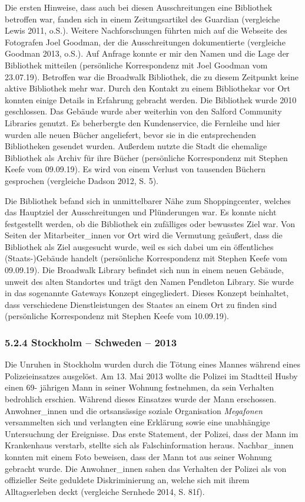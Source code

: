 \documentclass[a4paper,
fontsize=11pt,
oneside,
numbers=noperiodatend,
parskip=half-,
bibliography=totoc,
final
]{scrartcl}
\begin{document}
Die ersten Hinweise, dass auch bei diesen Ausschreitungen eine
Bibliothek betroffen war, fanden sich in einem Zeitungsartikel des
Guardian (vergleiche Lewis 2011, o.S.). Weitere Nachforschungen führten
mich auf die Webseite des Fotografen Joel Goodman, der die
Ausschreitungen dokumentierte (vergleiche Goodman 2013, o.S.). Auf
Anfrage konnte er mir den Namen und die Lage der Bibliothek mitteilen
(persönliche Korrespondenz mit Joel Goodman vom 23.07.19). Betroffen war
die Broadwalk Bibliothek, die zu diesem Zeitpunkt keine aktive
Bibliothek mehr war. Durch den Kontakt zu einem Bibliothekar vor Ort
konnten einige Details in Erfahrung gebracht werden. Die Bibliothek
wurde 2010 geschlossen. Das Gebäude wurde aber weiterhin von den Salford
Community Libraries genutzt. Es beherbergte den Kundenservice, die
Fernleihe und hier wurden alle neuen Bücher angeliefert, bevor sie in
die entsprechenden Bibliotheken gesendet wurden. Außerdem nutzte die
Stadt die ehemalige Bibliothek als Archiv für ihre Bücher (persönliche
Korrespondenz mit Stephen Keefe vom 09.09.19). Es wird von einem Verlust
von tausenden Büchern gesprochen (vergleiche Dadson 2012, S. 5).

Die Bibliothek befand sich in unmittelbarer Nähe zum Shoppingcenter,
welches das Hauptziel der Ausschreitungen und Plünderungen war. Es
konnte nicht festgestellt werden, ob die Bibliothek ein zufälliges oder
bewusstes Ziel war. Von Seiten der Mitarbeiter\_innen vor Ort wird die
Vermutung geäußert, dass die Bibliothek als Ziel ausgesucht wurde, weil
es sich dabei um ein öffentliches (Staats-)Gebäude handelt (persönliche
Korrespondenz mit Stephen Keefe vom 09.09.19). Die Broadwalk Library
befindet sich nun in einem neuen Gebäude, unweit des alten Standortes
und trägt den Namen Pendleton Library. Sie wurde in das sogenannte
Gateways Konzept eingegliedert. Dieses Konzept beinhaltet, dass
verschiedene Dienstleistungen des Staates an einem Ort zu finden sind
(persönliche Korrespondenz mit Stephen Keefe vom 10.09.19).

\hypertarget{stockholm-schweden-2013}{%
\subsubsection{5.2.4 Stockholm -- Schweden --
2013}\label{stockholm-schweden-2013}}

Die Unruhen in Stockholm wurden durch die Tötung eines Mannes während
eines Polizeieinsatzes ausgelöst. Am 13. Mai 2013 wollte die Polizei im
Stadtteil Husby einen 69- jährigen Mann in seiner Wohnung festnehmen, da
sein Verhalten bedrohlich erschien. Während dieses Einsatzes wurde der
Mann erschossen. Anwohner\_innen und die ortsansässige soziale
Organisation \emph{Megafonen} versammelten sich und verlangten eine
Erklärung sowie eine unabhängige Untersuchung der Ereignisse. Das erste
Statement, der Polizei, dass der Mann im Krankenhaus verstarb, stellte
sich als Falschinformation heraus. Nachbar\_innen konnten mit einem Foto
beweisen, dass der Mann tot aus seiner Wohnung gebracht wurde. Die
Anwohner\_innen sahen das Verhalten der Polizei als von offizieller
Seite geduldete Diskriminierung an, welche sich mit ihrem Alltagserleben
deckt (vergleiche Sernhede 2014, S. 81f).
\end{document}

